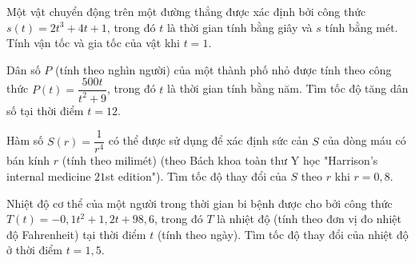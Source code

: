 \begin{bt}%
	Một vật chuyển động trên một  đường thẳng được xác định bởi công thức $s(t)=2t^3+4t+1$, trong đó $t$ là thời gian tính bằng giây và $s$ tính bằng mét. Tính vận tốc và gia tốc của vật khi $t=1$.
\end{bt}

\begin{bt}%
	Dân số $P$ (tính theo nghìn người) của một thành phố nhỏ được tính theo công thức $P(t)=\dfrac{500t}{t^2+9}$, trong đó $t$ là thời gian tính bằng năm. Tìm tốc độ tăng dân số tại thời điểm $t=12$.
\end{bt}

\begin{bt}%
	Hàm số $S(r)=\dfrac{1}{r^4}$ có thể được sử dụng để xác định sức cản $S$ của dòng máu có bán kính $r$ (tính theo milimét) (theo Bách khoa toàn thư Y học "Harrison's internal medicine  $21$st edition"). Tìm tốc độ thay đổi của $S$ theo $r$ khi $r=0,8$.
\end{bt}

\begin{bt}%
	Nhiệt độ cơ thể của một người trong thời gian bi bệnh được cho bởi công thức $T(t)=-0,1t^2+1,2t+98,6$, trong đó $T$ là nhiệt độ (tính theo đơn vị đo nhiệt độ Fahrenheit) tại thời điểm $t$ (tính theo ngày). Tìm tốc độ thay đổi của nhiệt độ ở thời điểm $t=1,5$.
\end{bt}

